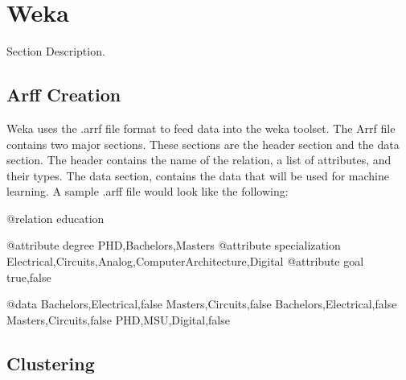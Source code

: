 \section{Weka}
\label{sect:weka}
Section Description.  

\subsection{Arff Creation}
Weka uses the .arrf file format to feed data into the weka toolset.  The Arrf
file contains two major sections.  These sections are the header section and the
data section.\cite{arrf}  The header contains the name of the relation, a list
of attributes, and their types.  The data section, contains the data that will
be used for machine learning.  A sample .arff file would look like the
following:

@relation education

@attribute degree {PHD,Bachelors,Masters}
@attribute specialization {Electrical,Circuits,Analog,ComputerArchitecture,Digital}
@attribute goal {true,false}

@data
Bachelors,Electrical,false
Masters,Circuits,false
Bachelors,Electrical,false
Masters,Circuits,false
PHD,MSU,Digital,false

\subsection{Clustering}

